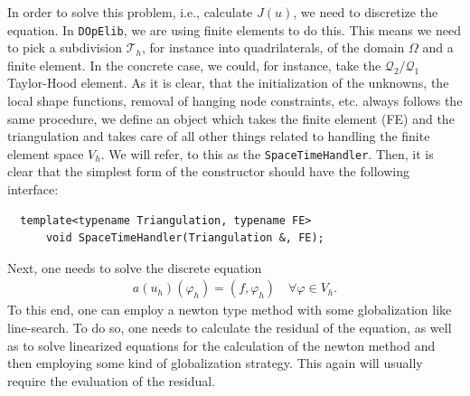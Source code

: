 \documentclass[prodmode,acmtoms]{acmsmall}
\numberwithin{equation}{section}
\renewcommand{\phi}{\varphi}
\newcommand{\dope}{\texttt{DOpElib}}
\begin{document}
In order to solve this problem, i.e., calculate $J(u)$, we need to discretize 
the equation. In \dope, we are using finite elements to do this. This means we need to pick a 
subdivision $\mathcal T_h$, for instance into quadrilaterals,
of the domain $\Omega$ and a finite element. In the concrete case, we could, 
for instance, take the $\mathcal Q_2/\mathcal Q_1$ Taylor-Hood element.
As it is clear, that the initialization of the unknowns, the local shape 
functions, removal of hanging node constraints, etc. always follows the 
same procedure, we define an object which takes the finite element (FE)
and the triangulation and takes care of all other things related to
handling the finite element space $V_h$. We will refer, to 
this as the \texttt{SpaceTimeHandler}. Then, it is clear that the simplest 
form of the constructor should have the following interface:
\begin{lstlisting}
  template<typename Triangulation, typename FE>
      void SpaceTimeHandler(Triangulation &, FE);
\end{lstlisting}
Next, one needs to solve the discrete equation
\begin{align}\label{eq:discrete_equation}
a(u_h)(\phi_h) = (f,\phi_h) \quad \forall \phi \in V_h.
\end{align}
To this end, one can employ a newton type method with some globalization 
like line-search. To do so, one needs to calculate the residual of the 
equation, as well as to solve linearized equations for the calculation of 
the newton method and then employing some kind of globalization strategy.
This again will usually require the evaluation of the residual.
\end{document}
